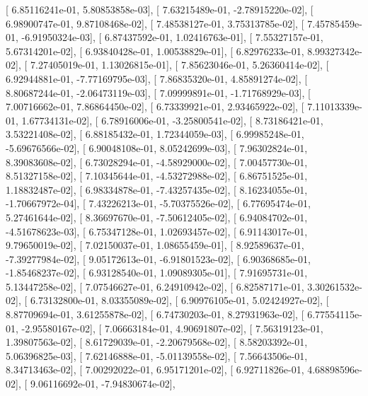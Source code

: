 \documentclass{article}
\begin{document}
       [  6.85116241e-01,   5.80853858e-03],
       [  7.63215489e-01,  -2.78915220e-02],
       [  6.98900747e-01,   9.87108468e-02],
       [  7.48538127e-01,   3.75313785e-02],
       [  7.45785459e-01,  -6.91950324e-03],
       [  6.87437592e-01,   1.02416763e-01],
       [  7.55327157e-01,   5.67314201e-02],
       [  6.93840428e-01,   1.00538829e-01],
       [  6.82976233e-01,   8.99327342e-02],
       [  7.27405019e-01,   1.13026815e-01],
       [  7.85623046e-01,   5.26360414e-02],
       [  6.92944881e-01,  -7.77169795e-03],
       [  7.86835320e-01,   4.85891274e-02],
       [  8.80687244e-01,  -2.06473119e-03],
       [  7.09999891e-01,  -1.71768929e-03],
       [  7.00716662e-01,   7.86864450e-02],
       [  6.73339921e-01,   2.93465922e-02],
       [  7.11013339e-01,   1.67734131e-02],
       [  6.78916006e-01,  -3.25800541e-02],
       [  8.73186421e-01,   3.53221408e-02],
       [  6.88185432e-01,   1.72344059e-03],
       [  6.99985248e-01,  -5.69676566e-02],
       [  6.90048108e-01,   8.05242699e-03],
       [  7.96302824e-01,   8.39083608e-02],
       [  6.73028294e-01,  -4.58929000e-02],
       [  7.00457730e-01,   8.51327158e-02],
       [  7.10345644e-01,  -4.53272988e-02],
       [  6.86751525e-01,   1.18832487e-02],
       [  6.98334878e-01,  -7.43257435e-02],
       [  8.16234055e-01,  -1.70667972e-04],
       [  7.43226213e-01,  -5.70375526e-02],
       [  6.77695474e-01,   5.27461644e-02],
       [  8.36697670e-01,  -7.50612405e-02],
       [  6.94084702e-01,  -4.51678623e-03],
       [  6.75347128e-01,   1.02693457e-02],
       [  6.91143017e-01,   9.79650019e-02],
       [  7.02150037e-01,   1.08655459e-01],
       [  8.92589637e-01,  -7.39277984e-02],
       [  9.05172613e-01,  -6.91801523e-02],
       [  6.90368685e-01,  -1.85468237e-02],
       [  6.93128540e-01,   1.09089305e-01],
       [  7.91695731e-01,   5.13447258e-02],
       [  7.07546627e-01,   6.24910942e-02],
       [  6.82587171e-01,   3.30261532e-02],
       [  6.73132800e-01,   8.03355089e-02],
       [  6.90976105e-01,   5.02424927e-02],
       [  8.87709694e-01,   3.61255878e-02],
       [  6.74730203e-01,   8.27931963e-02],
       [  6.77554115e-01,  -2.95580167e-02],
       [  7.06663184e-01,   4.90691807e-02],
       [  7.56319123e-01,   1.39807563e-02],
       [  8.61729039e-01,  -2.20679568e-02],
       [  8.58203392e-01,   5.06396825e-03],
       [  7.62146888e-01,  -5.01139558e-02],
       [  7.56643506e-01,   8.34713463e-02],
       [  7.00292022e-01,   6.95171201e-02],
       [  6.92711826e-01,   4.68898596e-02],
       [  9.06116692e-01,  -7.94830674e-02],
\end{document}
